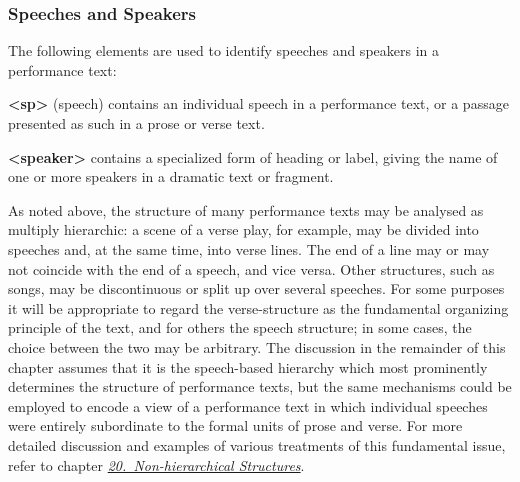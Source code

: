 \subsubsection[{Speeches and Speakers}]{Speeches and Speakers}\label{DRSP}\par
The following elements are used to identify speeches and speakers in a performance text: 
\begin{sansreflist}
  
\item [\textbf{<sp>}] (speech) contains an individual speech in a performance text, or a passage presented as such in a prose or verse text.
\item [\textbf{<speaker>}] contains a specialized form of heading or label, giving the name of one or more speakers in a dramatic text or fragment.
\end{sansreflist}
\par
As noted above, the structure of many performance texts may be analysed as multiply hierarchic: a scene of a verse play, for example, may be divided into speeches and, at the same time, into verse lines. The end of a line may or may not coincide with the end of a speech, and vice versa. Other structures, such as songs, may be discontinuous or split up over several speeches. For some purposes it will be appropriate to regard the verse-structure as the fundamental organizing principle of the text, and for others the speech structure; in some cases, the choice between the two may be arbitrary. The discussion in the remainder of this chapter assumes that it is the speech-based hierarchy which most prominently determines the structure of performance texts, but the same mechanisms could be employed to encode a view of a performance text in which individual speeches were entirely subordinate to the formal units of prose and verse. For more detailed discussion and examples of various treatments of this fundamental issue, refer to chapter \textit{\hyperref[NH]{20.\ Non-hierarchical Structures}}.\par
